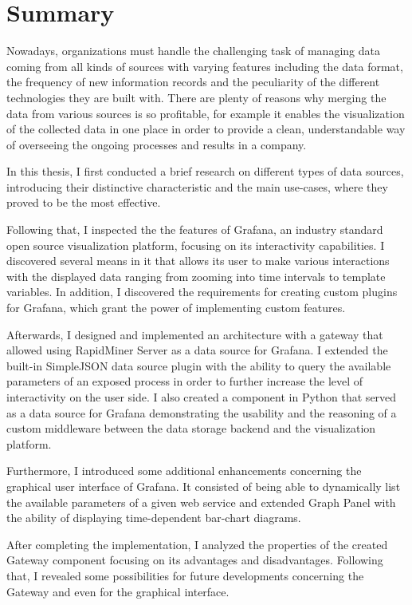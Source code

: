 \chapter{Summary}

Nowadays, organizations must handle the challenging task of managing data coming from all kinds of sources with varying features including the data format, the frequency of new information records and the peculiarity of the different technologies they are built with. There are plenty of reasons why merging the data from various sources is so profitable, for example it enables the visualization of the collected data in one place in order to provide a clean, understandable way of overseeing the ongoing processes and results in a company.

In this thesis, I first conducted a brief research on different types of data sources, introducing their distinctive characteristic and the main use-cases, where they proved to be the most effective.

Following that, I inspected the the features of Grafana, an industry standard open source visualization platform, focusing on its interactivity capabilities. I discovered several means in it that allows its user to make various interactions with the displayed data ranging from zooming into time intervals to template variables. In addition, I discovered the requirements for creating custom plugins for Grafana, which grant the power of implementing custom features.

Afterwards, I designed and implemented an architecture with a gateway that allowed using RapidMiner Server as a data source for Grafana. I extended the built-in SimpleJSON data source plugin with the ability to query the available parameters of an exposed process in order to further increase the level of interactivity on the user side. I also created a component in Python that served as a data source for Grafana demonstrating the usability and the reasoning of a custom middleware between the data storage backend and the visualization platform.

Furthermore, I introduced some additional enhancements concerning the graphical user interface of Grafana. It consisted of being able to dynamically list the available parameters of a given web service and extended Graph Panel with the ability of displaying time-dependent bar-chart diagrams.

After completing the implementation, I analyzed the properties of the created Gateway component focusing on its advantages and disadvantages. Following that, I revealed some possibilities for future developments concerning the Gateway and even for the graphical interface.

